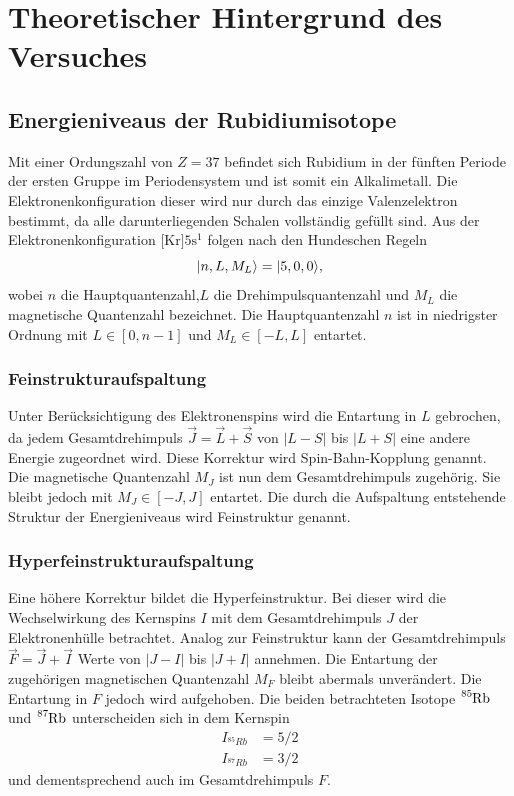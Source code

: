 \section{Theoretischer Hintergrund des Versuches}
\label{sec:Theorie}
\subsection{Energieniveaus der Rubidiumisotope}
Mit einer Ordungszahl von $Z=\num{37}$ befindet sich Rubidium in der 
fünften Periode der ersten Gruppe im Periodensystem und ist somit ein
Alkalimetall. Die Elektronenkonfiguration dieser wird nur durch 
das einzige Valenzelektron bestimmt, da alle darunterliegenden Schalen
vollständig gefüllt sind. Aus der Elektronenkonfiguration 
$\text{[Kr]}5\text{s}^1$ folgen nach den Hundeschen Regeln
\begin{equation*}
    \lvert {n,L,M_L} \rangle=\lvert {5,0,0} \rangle,
\end{equation*}
wobei $n$ die Hauptquantenzahl,$L$ die Drehimpulsquantenzahl
und $M_L$ die magnetische Quantenzahl bezeichnet. Die
Hauptquantenzahl $n$ ist in niedrigster Ordnung mit $L\in [0,n-1]$ und 
$M_L\in[-L,L]$ entartet. 

\subsubsection{Feinstrukturaufspaltung}
Unter Berücksichtigung des Elektronenspins
wird die Entartung in $L$ gebrochen, da jedem Gesamtdrehimpuls 
$\vec{J}=\vec{L}+\vec{S}$ von 
$|L-S|$ bis $|L+S|$ eine andere Energie zugeordnet wird. Diese 
Korrektur wird Spin-Bahn-Kopplung genannt. Die magnetische Quantenzahl
$M_J$ ist nun dem Gesamtdrehimpuls zugehörig. Sie bleibt jedoch mit 
$M_J\in[-J,J]$ entartet. Die durch die Aufspaltung entstehende Struktur
der Energieniveaus wird Feinstruktur genannt. 

\subsubsection{Hyperfeinstrukturaufspaltung}
Eine höhere Korrektur bildet die Hyperfeinstruktur. Bei dieser wird 
die Wechselwirkung des Kernspins $I$ mit dem Gesamtdrehimpuls $J$ der
Elektronenhülle betrachtet. Analog zur Feinstruktur kann der Gesamtdrehimpuls
$\vec{F}=\vec{J}+\vec{I}$ Werte von $|J-I|$ bis $|J+I|$ annehmen.
Die Entartung der zugehörigen magnetischen Quantenzahl $M_F$ bleibt
abermals unverändert. Die Entartung in $F$ jedoch wird aufgehoben. 
Die beiden betrachteten Isotope $\ce{^{85}Rb}$ und $\ce{^{87}Rb}$
unterscheiden sich in dem Kernspin
\begin{align*}
    I_{^{85}Rb}&=5/2\\
    I_{^{87}Rb}&=3/2
\end{align*}
und dementsprechend auch im Gesamtdrehimpuls $F$.

